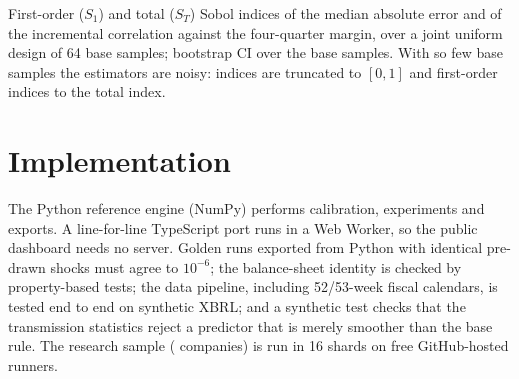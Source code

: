 \documentclass[11pt]{article}
\begin{document}
\begin{table}[h]
\centering\scriptsize
\caption{Liquidity events at other thresholds (given realized revenue)}
\label{tab:thresholds}

\end{table}

\begin{table}[h]
\centering\scriptsize
\caption{Coverage of 90\% intervals with group-conditional and adaptive conformal calibration}
\label{tab:cal2}

\end{table}

\begin{table}[h]
\centering\scriptsize
\caption{Holm-adjusted $p$-values of the secondary comparisons}
\label{tab:holm}

\end{table}

\ifdefined\SobN
\begin{table}[h]
\centering\scriptsize
\caption{Global (Sobol) sensitivity of the transmission result to the assumed parameters}
\label{tab:sobolass}

\par\smallskip
\begin{minipage}{\linewidth}\footnotesize
First-order ($S_1$) and total ($S_T$) Sobol indices of the median absolute error and of the incremental correlation
against the four-quarter margin, over a joint uniform design of 64 base samples; bootstrap CI over the base samples. With so few base samples the estimators are noisy: indices are truncated to $[0, 1]$ and first-order indices to the total index.
\end{minipage}
\end{table}
\fi

\section{Implementation}
The Python reference engine (NumPy) performs calibration, experiments and exports. A line-for-line TypeScript port runs in a Web Worker, so the public dashboard needs no server. Golden runs exported from Python with identical pre-drawn shocks must agree to $10^{-6}$; the balance-sheet identity is checked by property-based tests; the data pipeline, including 52/53-week fiscal calendars, is tested end to end on synthetic XBRL; and a synthetic test checks that the transmission statistics reject a predictor that is merely smoother than the base rule. The research sample (\UniverseN{} companies) is run in 16 shards on free GitHub-hosted runners.
\end{document}
